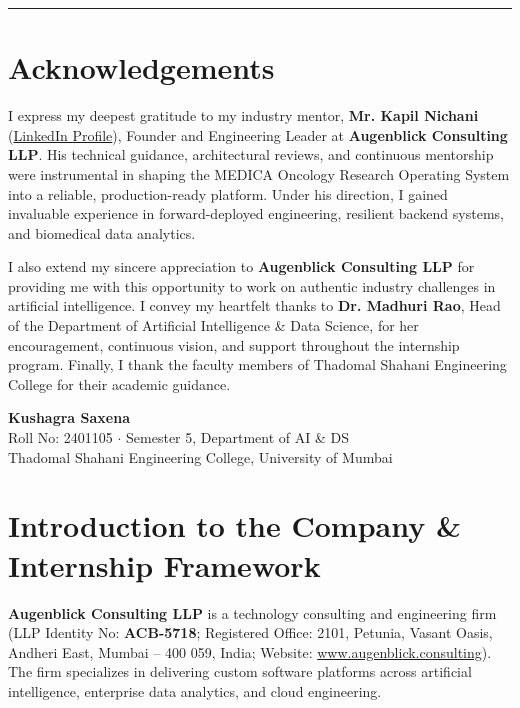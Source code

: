 \documentclass[11pt,a4paper]{article}
\begin{document}
\vspace{0.8cm}
\begin{center}
    \rule{0.8\linewidth}{0.4pt}
\end{center}
\vspace{0.2cm}

\section*{Acknowledgements}
I express my deepest gratitude to my industry mentor, \textbf{Mr. Kapil Nichani} (\href{https://www.linkedin.com/in/kapilnichani/}{LinkedIn Profile}), Founder and Engineering Leader at \textbf{Augenblick Consulting LLP}. His technical guidance, architectural reviews, and continuous mentorship were instrumental in shaping the MEDICA Oncology Research Operating System into a reliable, production-ready platform. Under his direction, I gained invaluable experience in forward-deployed engineering, resilient backend systems, and biomedical data analytics.

I also extend my sincere appreciation to \textbf{Augenblick Consulting LLP} for providing me with this opportunity to work on authentic industry challenges in artificial intelligence. I convey my heartfelt thanks to \textbf{Dr. Madhuri Rao}, Head of the Department of Artificial Intelligence \& Data Science, for her encouragement, continuous vision, and support throughout the internship program. Finally, I thank the faculty members of Thadomal Shahani Engineering College for their academic guidance.

\vspace{0.5cm}
\noindent
\textbf{Kushagra Saxena}\\
Roll No: 2401105 $\cdot$ Semester 5, Department of AI \& DS\\
Thadomal Shahani Engineering College, University of Mumbai

\clearpage

\section{Introduction to the Company \& Internship Framework}

\textbf{Augenblick Consulting LLP} is a technology consulting and engineering firm (LLP Identity No: \textbf{ACB-5718}; Registered Office: 2101, Petunia, Vasant Oasis, Andheri East, Mumbai -- 400 059, India; Website: \href{https://www.augenblick.consulting}{www.augenblick.consulting}). The firm specializes in delivering custom software platforms across artificial intelligence, enterprise data analytics, and cloud engineering.
\end{document}
